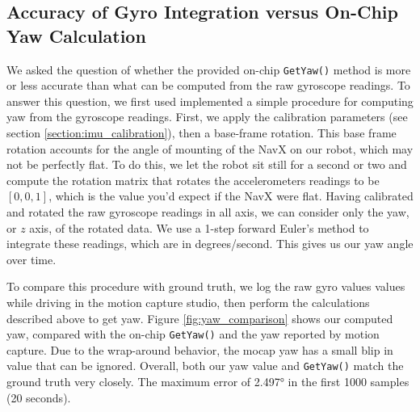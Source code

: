 \documentclass{article}
\begin{document}
  \subsection{Accuracy of Gyro Integration versus On-Chip Yaw Calculation} \label{section:yaw_accuracy}

    We asked the question of whether the provided on-chip \texttt{GetYaw()} method is more or less accurate than what can be computed from the raw gyroscope readings. To answer this question, we first used implemented a simple procedure for computing yaw from the gyroscope readings. First, we apply the calibration parameters (see section \ref{section:imu_calibration}), then a base-frame rotation. This base frame rotation accounts for the angle of mounting of the NavX on our robot, which may not be perfectly flat. To do this, we let the robot sit still for a second or two and compute the rotation matrix that rotates the accelerometers readings to be $[0,0,1]$, which is the value you'd expect if the NavX were flat. Having calibrated and rotated the raw gyroscope readings in all axis, we can consider only the yaw, or $z$ axis, of the rotated data. We use a 1-step forward Euler's method to integrate these readings, which are in degrees/second. This gives us our yaw angle over time.

    To compare this procedure with ground truth, we log the raw gyro values values while driving in the motion capture studio, then perform the calculations described above to get yaw. Figure \ref{fig:yaw_comparison} shows our computed yaw, compared with the on-chip \texttt{GetYaw()} and the yaw reported by motion capture. Due to the wrap-around behavior, the mocap yaw has a small blip in value that can be ignored. Overall, both our yaw value and \texttt{GetYaw()} match the ground truth very closely. The maximum error of \ang{2.497} in the first 1000 samples (20 seconds).
\end{document}
